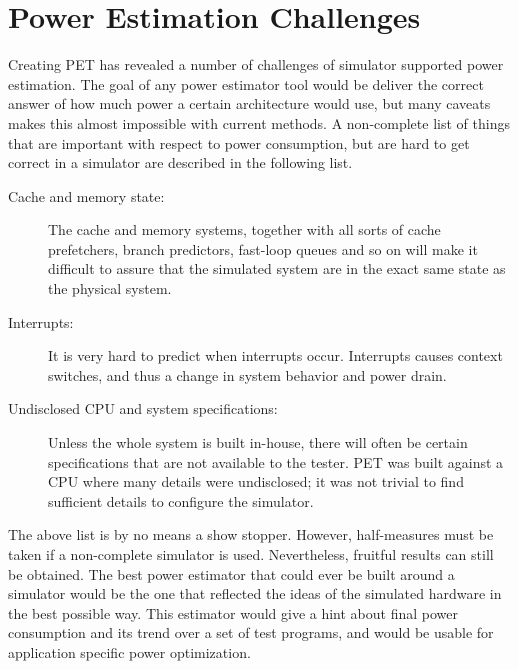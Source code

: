 \section{Power Estimation Challenges}

Creating PET has revealed a number of challenges of simulator supported power
estimation. The goal of any power estimator tool would be deliver the correct
answer of how much power a certain architecture would use, but many caveats
makes this almost impossible with current methods. A non-complete list of things
that are important with respect to power consumption, but are hard to get
correct in a simulator are described in the following list.

\begin{description}
    \item[Cache and memory state:]
        The cache and memory systems, together with all sorts of cache
        prefetchers, branch predictors, fast-loop queues and so on will make it
        difficult to assure that the simulated system are in the exact same
        state as the physical system.
    \item[Interrupts:]
        It is very hard to predict when interrupts occur. Interrupts causes
        context switches, and thus a change in system behavior and power drain.
    \item[Undisclosed CPU and system specifications:]
        Unless the whole system is built in-house, there will often be certain
        specifications that are not available to the tester. PET was built
        against a CPU where many details were undisclosed; it was not trivial to
        find sufficient details to configure the simulator.
\end{description}

The above list is by no means a show stopper. However, half-measures must be
taken if a non-complete simulator is used. Nevertheless, fruitful results can
still be obtained. The best power estimator that could ever be built around a
simulator would be the one that reflected the ideas of the simulated hardware in
the best possible way. This estimator would give a hint about final power
consumption and its trend over a set of test programs, and would be usable for
application specific power optimization.
